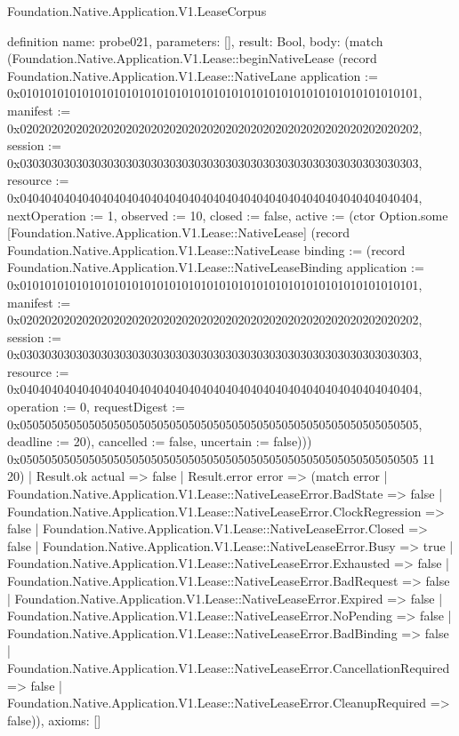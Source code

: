 \begin{lexlean}{Foundation.Native.Application.V1.LeaseCorpus}
\begin{semanticmodule}
definition{
  name: probe021,
  parameters: [],
  result: Bool,
  body: (match (Foundation.Native.Application.V1.Lease::beginNativeLease (record Foundation.Native.Application.V1.Lease::NativeLane {application := 0x0101010101010101010101010101010101010101010101010101010101010101, manifest := 0x0202020202020202020202020202020202020202020202020202020202020202, session := 0x0303030303030303030303030303030303030303030303030303030303030303, resource := 0x0404040404040404040404040404040404040404040404040404040404040404, nextOperation := 1, observed := 10, closed := false, active := (ctor Option.some [Foundation.Native.Application.V1.Lease::NativeLease] (record Foundation.Native.Application.V1.Lease::NativeLease {binding := (record Foundation.Native.Application.V1.Lease::NativeLeaseBinding {application := 0x0101010101010101010101010101010101010101010101010101010101010101, manifest := 0x0202020202020202020202020202020202020202020202020202020202020202, session := 0x0303030303030303030303030303030303030303030303030303030303030303, resource := 0x0404040404040404040404040404040404040404040404040404040404040404, operation := 0, requestDigest := 0x0505050505050505050505050505050505050505050505050505050505050505, deadline := 20}), cancelled := false, uncertain := false}))}) 0x0505050505050505050505050505050505050505050505050505050505050505 11 20)
    | Result.ok actual => false
    | Result.error error => (match error
      | Foundation.Native.Application.V1.Lease::NativeLeaseError.BadState => false
      | Foundation.Native.Application.V1.Lease::NativeLeaseError.ClockRegression => false
      | Foundation.Native.Application.V1.Lease::NativeLeaseError.Closed => false
      | Foundation.Native.Application.V1.Lease::NativeLeaseError.Busy => true
      | Foundation.Native.Application.V1.Lease::NativeLeaseError.Exhausted => false
      | Foundation.Native.Application.V1.Lease::NativeLeaseError.BadRequest => false
      | Foundation.Native.Application.V1.Lease::NativeLeaseError.Expired => false
      | Foundation.Native.Application.V1.Lease::NativeLeaseError.NoPending => false
      | Foundation.Native.Application.V1.Lease::NativeLeaseError.BadBinding => false
      | Foundation.Native.Application.V1.Lease::NativeLeaseError.CancellationRequired => false
      | Foundation.Native.Application.V1.Lease::NativeLeaseError.CleanupRequired => false)),
  axioms: []
}


\end{semanticmodule}
\end{lexlean}
